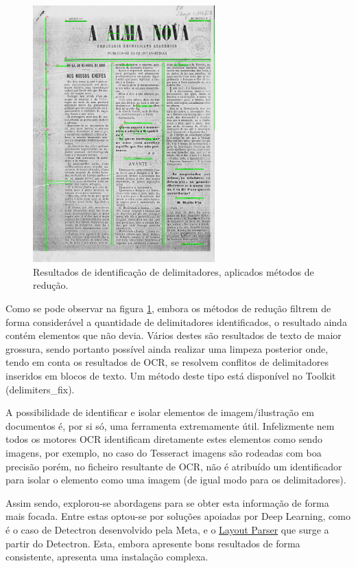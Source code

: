 \begin{figure}[H]
	\centering
	\includegraphics[width=7cm]{images/ilustracoes/get_delimiters_final_example.png}
	\caption{Resultados de identificação de delimitadores, aplicados métodos de redução.}
	\label{fig:get_delimiters_final_example}
\end{figure}

Como se pode observar na figura \ref{fig:get_delimiters_final_example}, embora os métodos de redução filtrem de forma considerável a quantidade de delimitadores identificados, o resultado ainda contém elementos que não devia. Vários destes são resultados de texto de maior grossura, sendo portanto possível ainda realizar uma limpeza posterior onde, tendo em conta os resultados de OCR, se resolvem conflitos de delimitadores inseridos em blocos de texto. Um método deste tipo está disponível no Toolkit (delimiters\_fix).


\label{contribution_image_document_image_identification}


A possibilidade de identificar e isolar elementos de imagem/ilustração em documentos é, por si só, uma ferramenta extremamente útil. Infelizmente nem todos os motores OCR identificam diretamente estes elementos como sendo imagens, por exemplo, no caso do Tesseract imagens são rodeadas com boa precisão porém, no ficheiro resultante de OCR, não é atribuído um identificador para isolar o elemento como uma imagem (de igual modo para os delimitadores). 

Assim sendo, explorou-se abordagens para se obter esta informação de forma mais focada.
Entre estas optou-se por soluções apoiadas por Deep Learning, como é o caso de Detectron desenvolvido pela Meta, e o \href{https://layout-parser.readthedocs.io/en/latest/index.html}{Layout Parser} que surge a partir do Detectron. Esta, embora apresente bons resultados de forma consistente, apresenta uma instalação complexa.

